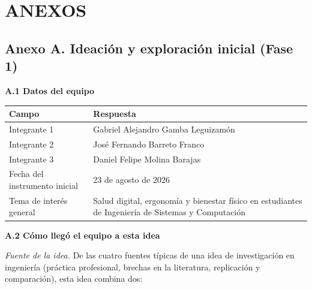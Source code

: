 %

\section*{\centering ANEXOS}

\subsection*{Anexo A. Ideación y exploración inicial (Fase 1)}

\bigskip
\noindent\textbf{A.1 Datos del equipo}
\begin{center}
\begin{tabularx}{\textwidth}{L{5cm} X}
\toprule
\textbf{Campo} & \textbf{Respuesta}\\
\midrule
Integrante 1 & Gabriel Alejandro Gamba Leguizamón\\
Integrante 2 & José Fernando Barreto Franco\\
Integrante 3 & Daniel Felipe Molina Barajas\\
Fecha del instrumento inicial & 23 de agosto de 2026\\
Tema de interés general & Salud digital, ergonomía y bienestar físico en estudiantes de Ingeniería de Sistemas y Computación\\
\bottomrule
\end{tabularx}
\end{center}

\bigskip
\noindent\textbf{A.2 Cómo llegó el equipo a esta idea}

\noindent\emph{Fuente de la idea.} De las cuatro fuentes típicas de una idea de
investigación en ingeniería (práctica profesional, brechas en la literatura,
replicación y comparación), esta idea combina dos:


